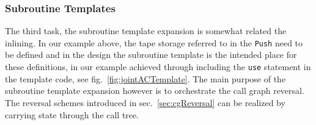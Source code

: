 \documentclass{book}
\newcommand{\refsec}[1]{{sec.~\ref{#1}}}
\newcommand{\reffig}[1]{{fig.~\ref{#1}}}
\begin{document}
\subsubsection{Subroutine Templates}\label{sec:templates}
The third task, the subroutine template expansion is somewhat related the inlining. 
In our example above, the tape storage referred to in the \lstinline{Push} need to be 
defined and in the design the subroutine template is the intended place for these definitions, 
in our example achieved through including the \lstinline{use} statement in the template code, 
see \reffig{fig:jointACTemplate}.
The main purpose of the subroutine template expansion however is to orchestrate the 
call graph reversal. The reversal schemes introduced in \refsec{sec:cgReversal}
can be realized by carrying state through the call tree. 
\end{document}
